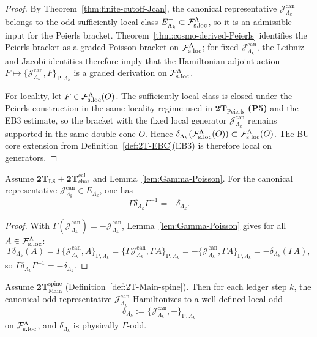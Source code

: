 \begin{proof}
By Theorem~\ref{thm:finite-cutoff-Jcan}, the canonical representative
\(\mathcal J^{\mathrm{can}}_{\Lambda_k}\) belongs to the odd sufficiently local class
\(E^-_{\Lambda_k}\subset\mathcal F_{\mathrm{s.loc}}^\Lambda\), so it is an admissible input for the Peierls
bracket.  Theorem~\ref{thm:cosmo-derived-Peierls} identifies the Peierls bracket as
a graded Poisson bracket on \(\mathcal F_{\mathrm{s.loc}}^\Lambda\); for fixed
\(\mathcal J^{\mathrm{can}}_{\Lambda_k}\), the Leibniz and Jacobi identities therefore
imply that the Hamiltonian adjoint action
\(
F\mapsto\{\mathcal J^{\mathrm{can}}_{\Lambda_k},F\}_{\mathrm P,\Lambda_k}
\)
is a graded derivation on \(\mathcal F_{\mathrm{s.loc}}^\Lambda\).

For locality, let \(F\in\mathcal F_{\mathrm{s.loc}}^\Lambda(O)\). The sufficiently local class is closed under
the Peierls construction in the same locality regime used in
\(\mathbf{2T}_{\mathrm{Peierls}}\)-\textbf{(P5)} and the EB3 estimate, so the
bracket with the fixed local generator \(\mathcal J^{\mathrm{can}}_{\Lambda_k}\) remains
supported in the same double cone \(O\). Hence
\(\delta_{\Lambda_k}(\mathcal F_{\mathrm{s.loc}}^\Lambda(O))\subset\mathcal F_{\mathrm{s.loc}}^\Lambda(O)\). The BU-core extension from
Definition~\ref{def:2T-EBC}\textnormal{(EB3)} is therefore local on generators.
\end{proof}

\begin{lemma}
\label{lem:Main-delta-omega-odd}
Assume \(\mathbf{2T}_{\mathrm{LS}}+\mathbf{2T}_{\mathrm{char}}^{\mathrm{cal}}\) and
Lemma~\ref{lem:Gamma-Poisson}. For the canonical representative
\(\mathcal J^{\mathrm{can}}_{\Lambda_k}\in E^-_{\Lambda_k}\), one has
\[
\Gamma\delta_{\Lambda_k}\Gamma^{-1}=-\delta_{\Lambda_k}.
\]
\end{lemma}

\begin{proof}
With \(\Gamma(\mathcal J^{\mathrm{can}}_{\Lambda_k})=-\mathcal J^{\mathrm{can}}_{\Lambda_k}\), Lemma~\ref{lem:Gamma-Poisson} gives for
all $A\in\mathcal F_{\mathrm{s.loc}}^\Lambda$:
\[
\Gamma\delta_{\Lambda_k}(A)
=\Gamma\{\mathcal J^{\mathrm{can}}_{\Lambda_k},A\}_{\mathrm P,\Lambda_k}
=\{\Gamma\mathcal J^{\mathrm{can}}_{\Lambda_k},\Gamma A\}_{\mathrm P,\Lambda_k}
=-\{\mathcal J^{\mathrm{can}}_{\Lambda_k},\Gamma A\}_{\mathrm P,\Lambda_k}
=-\delta_{\Lambda_k}(\Gamma A),
\]
so \(\Gamma\delta_{\Lambda_k}\Gamma^{-1}=-\delta_{\Lambda_k}\).
\end{proof}

\begin{theorem}
\label{thm:Main-Peierls-Hamiltonization}
Assume \(\mathbf{2T}_{\mathrm{Main}}^{\mathrm{spine}}\)
\textnormal{(Definition~\ref{def:2T-Main-spine})}.
Then for each ledger step \(k\), the canonical odd representative
\(\mathcal J^{\mathrm{can}}_{\Lambda_k}\) Hamiltonizes to a well-defined local odd
\[
\delta_{\Lambda_k}
:=
\{\mathcal J^{\mathrm{can}}_{\Lambda_k},-\}_{\mathrm P,\Lambda_k}
\]
on \(\mathcal F_{\mathrm{s.loc}}^\Lambda\), and \(\delta_{\Lambda_k}\) is physically \(\Gamma\)-odd.
\end{theorem}

